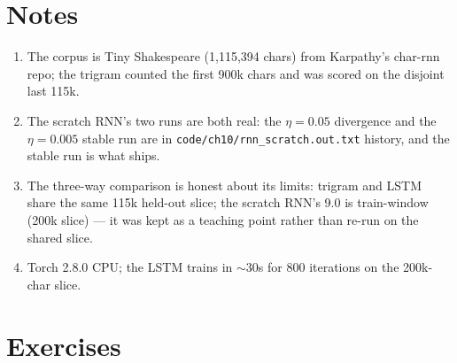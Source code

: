 \section*{Notes}
\begin{enumerate}
\item[\textbf{1.}] The corpus is Tiny Shakespeare (1,115,394 chars)
from Karpathy's char-rnn repo; the trigram counted the first 900k
chars and was scored on the disjoint last 115k.
\item[\textbf{2.}] The scratch RNN's two runs are both real: the
$\eta=0.05$ divergence and the $\eta=0.005$ stable run are in
\texttt{code/ch10/rnn\_scratch.out.txt} history, and the stable run is
what ships.
\item[\textbf{3.}] The three-way comparison is honest about its
limits: trigram and LSTM share the same 115k held-out slice; the
scratch RNN's 9.0 is train-window (200k slice) --- it was kept as a
teaching point rather than re-run on the shared slice.
\item[\textbf{4.}] Torch 2.8.0 CPU; the LSTM trains in $\sim$30s for
800 iterations on the 200k-char slice.
\end{enumerate}

\section{Exercises}
\label{sec:seqexercises}

